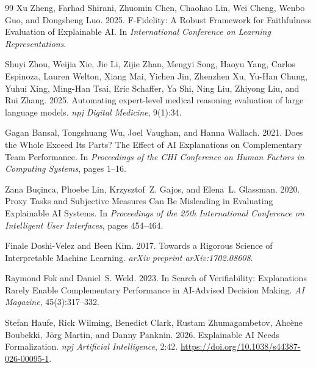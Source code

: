 \documentclass[twoside,11pt]{article}
\begin{document}
\begin{thebibliography}{99}
Xu Zheng, Farhad Shirani, Zhuomin Chen, Chaohao Lin, Wei Cheng,
Wenbo Guo, and Dongsheng Luo.
2025.
F-Fidelity: A Robust Framework for Faithfulness Evaluation of Explainable AI.
In \emph{International Conference on Learning Representations}.

Shuyi Zhou, Weijia Xie, Jie Li, Zijie Zhan, Mengyi Song, Haoyu Yang,
Carlos Espinoza, Lauren Welton, Xiang Mai, Yichen Jin, Zhenzhen Xu,
Yu-Han Chung, Yuhui Xing, Ming-Han Tsai, Eric Schaffer, Ya Shi,
Ning Liu, Zhiyong Liu, and Rui Zhang.
2025.
Automating expert-level medical reasoning evaluation of large language models.
\emph{npj Digital Medicine}, 9(1):34.

Gagan Bansal, Tongshuang Wu, Joel Vaughan, and Hanna Wallach.
2021.
Does the Whole Exceed Its Parts? The Effect of {AI} Explanations on
Complementary Team Performance.
In \emph{Proceedings of the CHI Conference on Human Factors in Computing Systems},
pages 1--16.

Zana Bu\c{c}inca, Phoebe Lin, Krzysztof~Z. Gajos, and Elena~L. Glassman.
2020.
Proxy Tasks and Subjective Measures Can Be Misleading in Evaluating Explainable
{AI} Systems.
In \emph{Proceedings of the 25th International Conference on Intelligent User
Interfaces}, pages 454--464.

Finale Doshi-Velez and Been Kim.
2017.
Towards a Rigorous Science of Interpretable Machine Learning.
\emph{arXiv preprint arXiv:1702.08608}.

Raymond Fok and Daniel~S. Weld.
2023.
In Search of Verifiability: Explanations Rarely Enable Complementary Performance
in {AI}-Advised Decision Making.
\emph{AI Magazine}, 45(3):317--332.

Stefan Haufe, Rick Wilming, Benedict Clark, Rustam Zhumagambetov, Ahc\`ene
Boubekki, J{\"o}rg Martin, and Danny Panknin.
2026.
Explainable {AI} Needs Formalization.
\emph{npj Artificial Intelligence}, 2:42.
\url{https://doi.org/10.1038/s44387-026-00095-1}.


\end{thebibliography}
\end{document}
